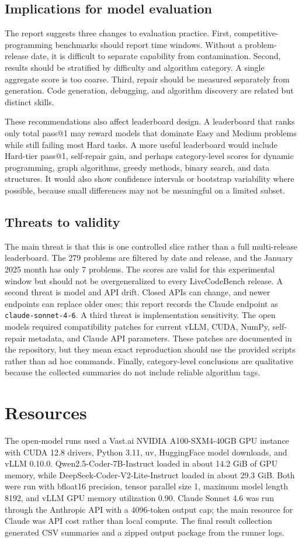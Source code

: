 \documentclass[11pt]{article}
\makeatletter
\newcommand{\lcb}{LiveCodeBench}
\newcommand{\passone}{pass@1}
\makeatother
\begin{document}
\subsection{Implications for model evaluation}
The report suggests three changes to evaluation practice. First, competitive-programming benchmarks should report time windows. Without a problem-release date, it is difficult to separate capability from contamination. Second, results should be stratified by difficulty and algorithm category. A single aggregate score is too coarse. Third, repair should be measured separately from generation. Code generation, debugging, and algorithm discovery are related but distinct skills.

These recommendations also affect leaderboard design. A leaderboard that ranks only total \passone{} may reward models that dominate Easy and Medium problems while still failing most Hard tasks. A more useful leaderboard would include Hard-tier \passone{}, self-repair gain, and perhaps category-level scores for dynamic programming, graph algorithms, greedy methods, binary search, and data structures. It would also show confidence intervals or bootstrap variability where possible, because small differences may not be meaningful on a limited subset.

\subsection{Threats to validity}
The main threat is that this is one controlled slice rather than a full multi-release leaderboard. The 279 problems are filtered by date and release, and the January 2025 month has only 7 problems. The scores are valid for this experimental window but should not be overgeneralized to every \lcb{} release. A second threat is model and API drift. Closed APIs can change, and newer endpoints can replace older ones; this report records the Claude endpoint as \texttt{claude-sonnet-4-6}. A third threat is implementation sensitivity. The open models required compatibility patches for current vLLM, CUDA, NumPy, self-repair metadata, and Claude API parameters. These patches are documented in the repository, but they mean exact reproduction should use the provided scripts rather than ad hoc commands. Finally, category-level conclusions are qualitative because the collected summaries do not include reliable algorithm tags.

\section{Resources}
The open-model runs used a Vast.ai NVIDIA A100-SXM4-40GB GPU instance with CUDA 12.8 drivers, Python 3.11, uv, HuggingFace model downloads, and vLLM 0.10.0. Qwen2.5-Coder-7B-Instruct loaded in about 14.2 GiB of GPU memory, while DeepSeek-Coder-V2-Lite-Instruct loaded in about 29.3 GiB. Both were run with bfloat16 precision, tensor parallel size 1, maximum model length 8192, and vLLM GPU memory utilization 0.90. Claude Sonnet 4.6 was run through the Anthropic API with a 4096-token output cap; the main resource for Claude was API cost rather than local compute. The final result collection generated CSV summaries and a zipped output package from the runner logs.
\end{document}
